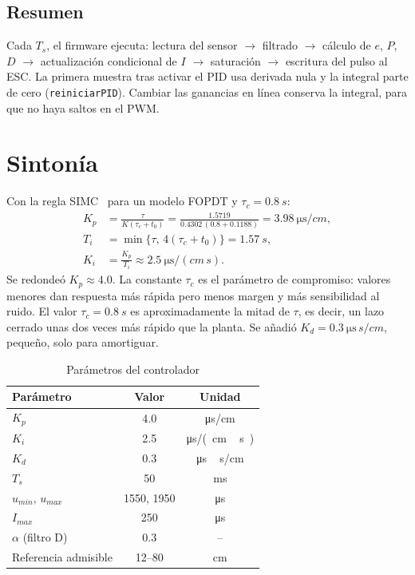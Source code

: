 \documentclass[conference,10pt]{IEEEtran}
\begin{document}
\subsection{Resumen}
Cada $T_s$, el firmware ejecuta: lectura del sensor $\rightarrow$ filtrado $\rightarrow$ cálculo de $e$, $P$, $D$ $\rightarrow$ actualización condicional de $I$ $\rightarrow$ saturación $\rightarrow$ escritura del pulso al ESC. La primera muestra tras activar el PID usa derivada nula y la integral parte de cero (\texttt{reiniciarPID}). Cambiar las ganancias en línea conserva la integral, para que no haya saltos en el PWM.

\section{Sintonía}
Con la regla SIMC~\cite{skogestad} para un modelo FOPDT y $\tau_c=\SI{0.8}{s}$:
\begin{align}
K_p&=\frac{\tau}{K(\tau_c+t_0)}=\frac{1.5719}{0.4302\,(0.8+0.1188)}=\SI{3.98}{\micro\second/cm},\\
T_i&=\min\{\tau,\,4(\tau_c+t_0)\}=\SI{1.57}{s},\\
K_i&=\frac{K_p}{T_i}\approx\SI{2.5}{\micro\second/(cm\,s)}.
\end{align}
Se redondeó $K_p\approx4.0$. La constante $\tau_c$ es el parámetro de compromiso: valores menores dan respuesta más rápida pero menos margen y más sensibilidad al ruido. El valor $\tau_c=\SI{0.8}{s}$ es aproximadamente la mitad de $\tau$, es decir, un lazo cerrado unas dos veces más rápido que la planta. Se añadió $K_d=\SI{0.3}{\micro\second\,s/cm}$, pequeño, solo para amortiguar.

\begin{table}[t]
\caption{Parámetros del controlador}
\label{tab:params}
\centering
\begin{tabular}{lcc}
\toprule
Parámetro & Valor & Unidad \\
\midrule
$K_p$ & 4.0 & \si{\micro\second/cm} \\
$K_i$ & 2.5 & \si{\micro\second/(cm\,s)} \\
$K_d$ & 0.3 & \si{\micro\second\,s/cm} \\
$T_s$ & 50 & \si{ms} \\
$u_{min},\,u_{max}$ & 1550, 1950 & \si{\micro\second} \\
$I_{max}$ & 250 & \si{\micro\second} \\
$\alpha$ (filtro D) & 0.3 & -- \\
Referencia admisible & 12--80 & \si{cm} \\
\bottomrule
\end{tabular}
\end{table}
\end{document}
